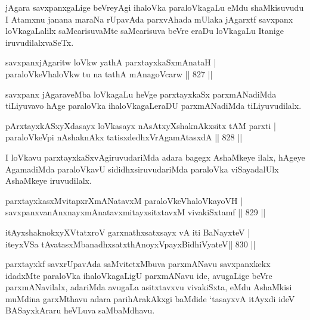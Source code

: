 \begin{artha}
jAgara savxpanxgaLige beVreyAgi ihaloVka paraloVkagaLu eMdu shaMkisuvudu I Atamxnu janana maraNa rUpavAda parxvAhada mUlaka jAgarxtf savxpanx loVkagaLalilx saMcarisuvaMte saMcarisuva beVre eraDu loVkagaLu Itanige iruvudilalxvaSeTx.
\end{artha}

\begin{shl}
savxpanxjAgaritw loVkw yathA parxtayxkaSxmAnataH | \\
paraloVkeVhaloVkw tu na tathA mAnagoVcarw \hfill||  827 ||  
\end{shl}

\begin{artha}
savxpanx jAgaraveMba loVkagaLu heVge parxtayxkaSx parxmANadiMda tiLiyuvavo hAge paraloVka ihaloVkagaLeraDU parxmANadiMda tiLiyuvudilalx.
\end{artha}


\begin{shl}
pArxtayxkASxyXdasayx loVkasayx nAsAtxyXshaknAkx\s sitx tAM parxti | \\
paraloVkeV\s pi nA\s \s shaknAkx tatisxdedhxVrAgamAtasxdA \hfill||  828 ||  
\end{shl}

\begin{artha}
I loVkavu parxtayxkaSxvAgiruvudariMda adara bagegx AshaMkeye ilalx, hAgeye AgamadiMda paraloVkavU sididhxsiruvudariMda paraloVka viSayadalUlx AshaMkeye iruvudilalx.
\end{artha}


\begin{shl}
parxtayxkasxMvitapxrXmANatavxM paraloVkeVhaloVkayoVH | \\
savxpanxvanAnxnayxmAnatavxmitayxsitxtavxM vivakiSxtamf \hfill||  829 ||  
\end{shl}
				
\begin{shl}
itAyxshaknokxyXVtatxroV garxnathxsatxsayx vA iti BaNayxteV | \\
iteyxVSa tAvatasxMbanadhxsatxthA\s noyxV\s payxBidhiVyateV\hfill ||  830 ||  
\end{shl}

\begin{artha}
parxtayxkf savxrUpavAda saMvitetxMbuva parxmANavu savxpanxkekx idadxMte paraloVka ihaloVkagaLigU parxmANavu ide, avugaLige beVre parxmANavilalx, adariMda avugaLa asitxtavxvu vivakiSxta, eMdu AshaMkisi muMdina garxMthavu adara parihArakAkxgi baMdide `tasayxvA itAyxdi ideV BASayxkAraru heVLuva saMbaMdhavu.
\end{artha}


